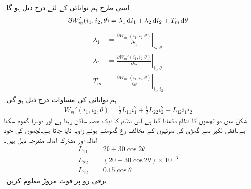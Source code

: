 اسی طرح ہم توانائی کے لئے درج ذیل ہو گا۔
\begin{align}
\partial W_m'(i_1,i_2,\theta)=\lambda_1 \dif i_1+\lambda_2 \dif i_2+T_m \dif \theta
\end{align}
%
\begin{gather}
\begin{aligned}\label{مساوات_تبادلہ_کوتوانائی_سے_مروڑ}
\lambda_1&=\left.\frac{\partial W_m'(i_1,i_2,\theta)}{\partial i_1} \right|_{i_2,\theta}\\
\lambda_2&=\left.\frac{\partial W_m'(i_1,i_2,\theta)}{\partial i_2} \right|_{i_1,\theta}\\
T_m&=\left.\frac{\partial W_m'(i_1,i_2,\theta)}{\partial \theta} \right|_{i_1,i_2}
\end{aligned}
\end{gather}
ہم توانائی کی مساوات درج ذیل ہو گی۔
\begin{align}\label{مساوات_تبادلہ_کوتوانائی_از_خود}
W_m'(i_1,i_2,\theta)=\frac{1}{2} L_{11} i_1^2+\frac{1}{2} L_{22} i_2^2+L_{12} i_1 i_2
\end{align}
%
شکل   میں دو لچھوں کا نظام دکھایا گیا ہے۔اس نظام کا ایک حصہ ساکن رہتا ہے اور دوسرا گھوم سکتا ہے۔افقی لکیر سے گھڑی کی سوئیوں  کے مخالف رخ گھومتے ہوئے  زاویہ   ناپا جاتا ہے۔لچھوں کی خود امالہ اور مشترکہ امالہ مندرجہ ذیل ہیں۔
\begin{align*}
L_{11}&=20+30\cos 2 \theta\\
L_{22}&=\left(20+30\cos 2\theta \right) \times 10^{-3}\\
L_{12}&=0.15 \cos \theta
\end{align*}
 برقی رو   پر قوت مروڑ  معلوم کریں۔
